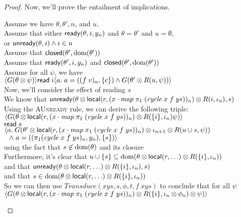 \begin{proof}
Now, we'll prove the entailment of implications. 
\begin{tabbedproof}
\oo Assume we have $\theta, \theta', n$, and $u$. \\
\oo Assume that either $\mathsf{ready}({\theta}, {i}, {y_n})$ and $\theta = \theta'$ and $u = \emptyset$,  \\
\oo or $\mathsf{unready}({\theta}, {i}) \land i \in u$ \\
\oo Assume that $\mathsf{closed}({\theta'}, {\mbox{dom}({\theta'})})$ \\
\oo Assume that $\mathsf{ready}({\theta'}, {i}, {y_n})$ and $\mathsf{closed}({\theta'}, {\mbox{dom}({\theta'})})$ \\
\oo Assume for all $\psi$, we have \\
\ox  $\langle{G(\theta \otimes \psi)}\rangle{\mathsf{read}\;i}\langle{a}.\;{a = ((f\;v)_n, \{{c}\}) 
      \land G(\theta' \otimes R(u,\psi)) }\rangle$ \\
\oo Now, we'll consider the effect of reading $s$ \\
\ooo We know that $\mathsf{unready}({\theta \otimes \mathsf{local}({r}, {(x \cdot \mathit{map}\;\pi_1\;(\mathit{cycle}\;x\;f\;ys))_n}) \otimes R(i, \iota_n)}, {s})$ \\
\ooo Using the \textsc{AUnready} rule, we can derive the following triple: \\
\ooo $\left<G(\theta \otimes \mathsf{local}({r}, {(x \cdot \mathit{map}\;\pi_1\;(\mathit{cycle}\;x\;f\;ys))_n}) \otimes R(\{{i}\}, \iota_n) \psi)\right>$ \\
\ooo $\mathsf{read}\; s$ \\
\ooo $\left<a.\; G(\theta' \otimes \mathsf{local}({r}, {(x \cdot \mathit{map}\;\pi_1\;(\mathit{cycle}\;x\;f\;ys))_n}) \otimes \iota_{n+1} \otimes R(u \cup {s},\psi))\right.$ \\
\ooo $\left.\;\;\land\;a = ((\pi_1(\mathit{cycle}\;x\;f\;ys)_n, y_n), \{{s}\}) \right>$ \\
\ooo using the fact that $s \not\in \mbox{dom}({\theta})$ and its closure \\
\oo Furthermore, it's clear that $u \cup \{{s}\} \subseteq \mbox{dom}({\theta \otimes \mathsf{local}({r}, {\ldots}) \otimes R(\{{i}\}, \iota_n)})$\\
\oo and that $\mathsf{unready}({\theta \otimes \mathsf{local}({r}, {\ldots}) \otimes R(\{{i}\}, \iota_n)}, {s})$ \\
\oo and that $s \in \mbox{dom}({\theta \otimes \mathsf{local}({r}, {\ldots}) \otimes R(\{{i}\}, \iota_n)})$\\
\oo So we can then use $\mathit{Transduce}(xys, s, \phi, t, f\;xys)$ to conclude that for all $\psi$\\
\ooo $\left<G(\theta \otimes \mathsf{local}({r}, {(x \cdot \mathit{map}\;\pi_1\;(\mathit{cycle}\;x\;f\;ys))_n}) \otimes R(\{{i}\}, \iota_n \otimes \phi_n) \otimes \psi)\right>$\\

\end{tabbedproof}
\end{proof}
